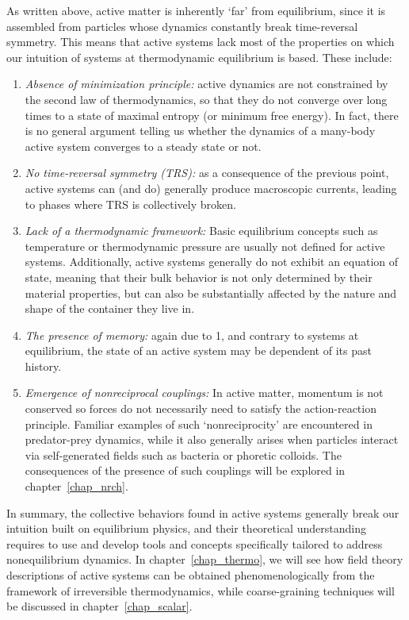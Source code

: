 As written above, active matter is inherently `far' from equilibrium, since it is assembled from particles whose dynamics constantly break time-reversal symmetry. This means that active systems lack most of the properties on which our intuition of systems at thermodynamic equilibrium is based. These include:
%
\begin{enumerate}
    \item \textit{Absence of minimization principle:} active dynamics are not constrained by the second law of thermodynamics, so that they do not converge over long times to a state of maximal entropy (or minimum free energy). In fact, there is no general argument telling us whether the dynamics of a many-body active system converges to a steady state or not.
    \item \textit{No time-reversal symmetry (TRS):} as a consequence of the previous point, active systems can (and do) generally produce macroscopic currents, leading to phases where TRS is collectively broken.
    \item \textit{Lack of a thermodynamic framework:} Basic equilibrium concepts such as temperature or thermodynamic pressure are usually not defined for active systems. Additionally, active systems generally do not exhibit an equation of state, meaning that their bulk behavior is not only determined by their material properties, but can also be substantially affected by the nature and shape of the container they live in.
    \item \textit{The presence of memory:} again due to 1, and contrary to systems at equilibrium, the state of an active system may be dependent of its past history.
    \item \textit{Emergence of nonreciprocal couplings:} In active matter, momentum is not conserved so forces do not necessarily need to satisfy the action-reaction principle. Familiar examples of such `nonreciprocity' are encountered in predator-prey dynamics, while it also generally arises when particles interact via self-generated fields such as bacteria or phoretic colloids.
    The consequences of the presence of such couplings will be explored in chapter~\ref{chap_nrch}.
\end{enumerate}
%
In summary, the collective behaviors found in active systems generally break our intuition built on equilibrium physics, and their theoretical understanding requires to use and develop tools and concepts specifically tailored to address nonequilibrium dynamics.
In chapter~\ref{chap_thermo}, we will see how field theory descriptions of active systems can be obtained phenomenologically from the framework of irreversible thermodynamics, while coarse-graining techniques will be discussed in chapter~\ref{chap_scalar}.


